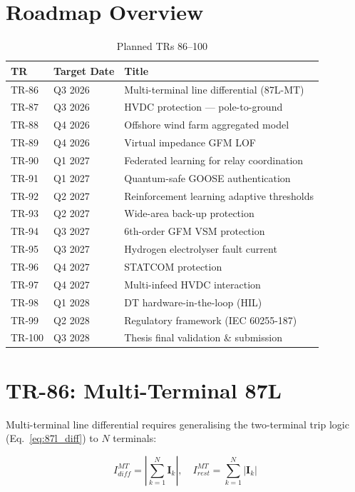 \documentclass[11pt,a4paper]{report}
\newcommand{\bvec}[1]{\mathbf{#1}}
\begin{document}
\section{Roadmap Overview}

\begin{table}[ht]
\centering
\caption{Planned TRs 86--100}
\label{tab:future_trs}
\begin{tabular}{llp{7cm}}
\toprule
TR & Target Date & Title \\
\midrule
TR-86 & Q3 2026 & Multi-terminal line differential (87L-MT) \\
TR-87 & Q3 2026 & HVDC protection — pole-to-ground \\
TR-88 & Q4 2026 & Offshore wind farm aggregated model \\
TR-89 & Q4 2026 & Virtual impedance GFM LOF \\
TR-90 & Q1 2027 & Federated learning for relay coordination \\
TR-91 & Q1 2027 & Quantum-safe GOOSE authentication \\
TR-92 & Q2 2027 & Reinforcement learning adaptive thresholds \\
TR-93 & Q2 2027 & Wide-area back-up protection \\
TR-94 & Q3 2027 & 6th-order GFM VSM protection \\
TR-95 & Q3 2027 & Hydrogen electrolyser fault current \\
TR-96 & Q4 2027 & STATCOM protection \\
TR-97 & Q4 2027 & Multi-infeed HVDC interaction \\
TR-98 & Q1 2028 & DT hardware-in-the-loop (HIL) \\
TR-99 & Q2 2028 & Regulatory framework (IEC 60255-187) \\
TR-100 & Q3 2028 & Thesis final validation \& submission \\
\bottomrule
\end{tabular}
\end{table}

\section{TR-86: Multi-Terminal 87L}

Multi-terminal line differential requires generalising the two-terminal trip logic (Eq.~\ref{eq:87l_diff}) to $N$ terminals:

\begin{equation}
\label{eq:87l_mt}
I_{diff}^{MT} = \left|\sum_{k=1}^{N} \bvec{I}_k\right|, \quad
I_{rest}^{MT} = \sum_{k=1}^{N} |\bvec{I}_k|
\end{equation}
\end{document}
